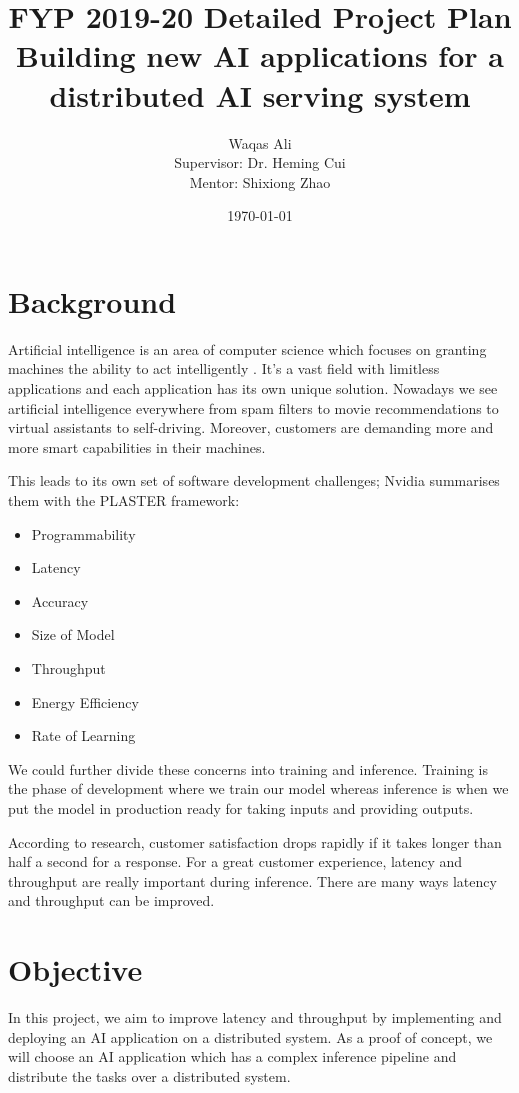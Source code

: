 \documentclass{article}
\title{FYP 2019-20 Detailed Project Plan \\ Building new AI applications for a distributed AI serving system}
\author{Waqas Ali\\{\small Supervisor: Dr. Heming Cui}\\{\small Mentor: Shixiong Zhao}}
\date{\today}
\begin{document}
\maketitle
 
\section{Background}
Artificial intelligence is an area of computer science which focuses on granting machines the ability to act intelligently \cite{McCarthy2007}. It's a vast field with limitless applications and each application has its own unique solution. Nowadays we see artificial intelligence everywhere from spam filters to movie recommendations to virtual assistants to self-driving. Moreover, customers are demanding more and more smart capabilities in their machines.

This leads to its own set of software development challenges; Nvidia summarises them with the PLASTER framework:
\begin{itemize}
  \item Programmability
  \item Latency
  \item Accuracy
  \item Size of Model
  \item Throughput
  \item Energy Efficiency
  \item Rate of Learning
\end{itemize}

We could further divide these concerns into training and inference. Training is the phase of development where we train our model whereas inference is when we put the model in production ready for taking inputs and providing outputs.

According to research, customer satisfaction drops rapidly if it takes longer than half a second for a response. For a great customer experience, latency and throughput are really important during inference.  There are many ways latency and throughput can be improved.

\section{Objective}
In this project, we aim to improve latency and throughput by implementing and deploying an AI application on a distributed system. As a proof of concept, we will choose an AI application which has a complex inference pipeline and distribute the tasks over  a distributed system.
\end{document}
